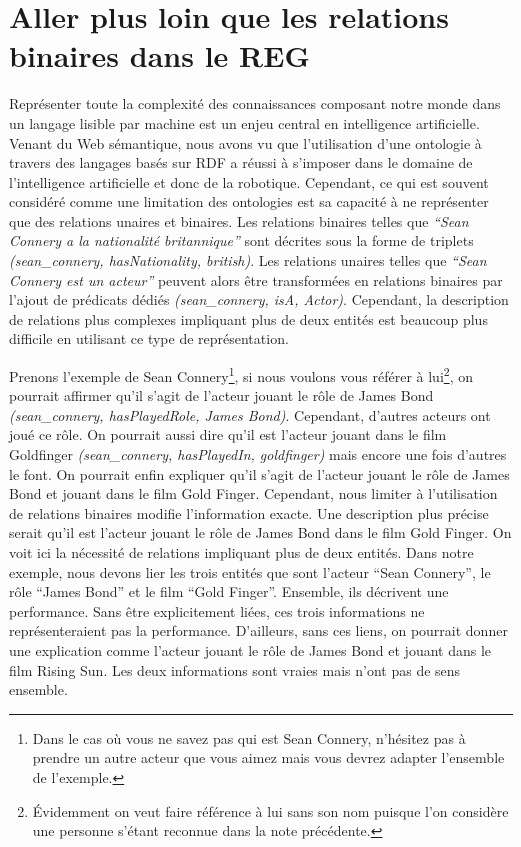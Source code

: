 \section*{Aller plus loin que les relations binaires dans le REG}

Représenter toute la complexité des connaissances composant notre monde dans un langage lisible par machine est un enjeu central en intelligence artificielle. Venant du Web sémantique, nous avons vu que l'utilisation d'une ontologie à travers des langages basés sur RDF a réussi à s'imposer dans le domaine de l'intelligence artificielle et donc de la robotique. Cependant, ce qui est souvent considéré comme une limitation des ontologies est sa capacité à ne représenter que des relations unaires et binaires. Les relations binaires telles que \textit{``Sean Connery a la nationalité britannique''} sont décrites sous la forme de triplets \textit{(sean\_connery, hasNationality, british)}. Les relations unaires telles que \textit{``Sean Connery est un acteur''} peuvent alors être transformées en relations binaires par l'ajout de prédicats dédiés \textit{(sean\_connery, isA, Actor)}. Cependant, la description de relations plus complexes impliquant plus de deux entités est beaucoup plus difficile en utilisant ce type de représentation.

Prenons l'exemple de Sean Connery\footnote{Dans le cas où vous ne savez pas qui est Sean Connery, n'hésitez pas à prendre un autre acteur que vous aimez mais vous devrez adapter l'ensemble de l'exemple.}, si nous voulons vous référer à lui\footnote {Évidemment on veut faire référence à lui sans son nom puisque l'on considère une personne s'étant reconnue dans la note précédente.}, on pourrait affirmer qu'il s'agit de l'acteur jouant le rôle de James Bond \textit{(sean\_connery, hasPlayedRole, James Bond)}. Cependant, d'autres acteurs ont joué ce rôle. On pourrait aussi dire qu'il est l'acteur jouant dans le film Goldfinger \textit{(sean\_connery, hasPlayedIn, goldfinger)} mais encore une fois d'autres le font. On pourrait enfin expliquer qu'il s'agit de l'acteur jouant le rôle de James Bond et jouant dans le film Gold Finger. Cependant, nous limiter à l'utilisation de relations binaires modifie l'information exacte. Une description plus précise serait qu'il est l'acteur jouant le rôle de James Bond dans le film Gold Finger. On voit ici la nécessité de relations impliquant plus de deux entités. Dans notre exemple, nous devons lier les trois entités que sont l'acteur ``Sean Connery'', le rôle ``James Bond'' et le film ``Gold Finger''. Ensemble, ils décrivent une performance. Sans être explicitement liées, ces trois informations ne représenteraient pas la performance. D'ailleurs, sans ces liens, on pourrait donner une explication comme l'acteur jouant le rôle de James Bond et jouant dans le film Rising Sun. Les deux informations sont vraies mais n'ont pas de sens ensemble.

